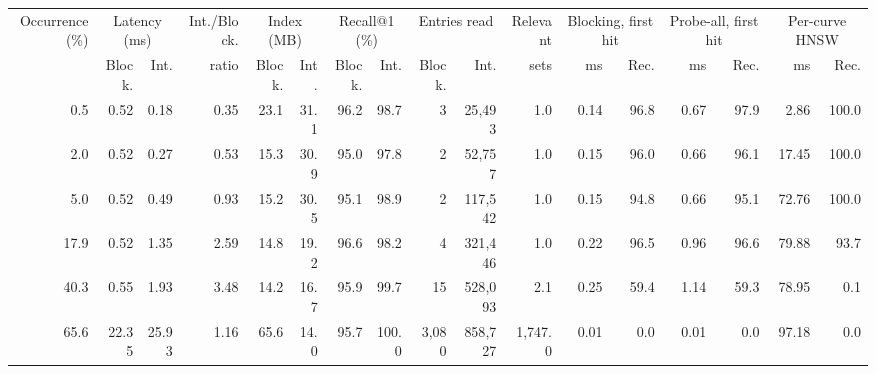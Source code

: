\begin{tabular}{rrrrrrrrrrrrrrrrr}
\toprule
Occurrence (\%) & \multicolumn{2}{c}{Latency (ms)} & Int./Block. & \multicolumn{2}{c}{Index (MB)} & \multicolumn{2}{c}{Recall@1 (\%)} & \multicolumn{2}{c}{Entries read} & Relevant & \multicolumn{2}{c}{Blocking, first hit} & \multicolumn{2}{c}{Probe-all, first hit} & \multicolumn{2}{c}{Per-curve HNSW}\\
\cmidrule(lr){2-3}\cmidrule(lr){5-6}\cmidrule(lr){7-8}\cmidrule(lr){9-10}\cmidrule(lr){12-13}\cmidrule(lr){14-15}\cmidrule(lr){16-17}
 & Block. & Int. & ratio & Block. & Int. & Block. & Int. & Block. & Int. & sets & ms & Rec. & ms & Rec. & ms & Rec.\\
\midrule
0.5 & 0.52 & 0.18 & 0.35 & 23.1 & 31.1 & 96.2 & 98.7 & 3 & 25{,}493 & 1.0 & 0.14 & 96.8 & 0.67 & 97.9 & 2.86 & 100.0\\
2.0 & 0.52 & 0.27 & 0.53 & 15.3 & 30.9 & 95.0 & 97.8 & 2 & 52{,}757 & 1.0 & 0.15 & 96.0 & 0.66 & 96.1 & 17.45 & 100.0\\
5.0 & 0.52 & 0.49 & 0.93 & 15.2 & 30.5 & 95.1 & 98.9 & 2 & 117{,}542 & 1.0 & 0.15 & 94.8 & 0.66 & 95.1 & 72.76 & 100.0\\
17.9 & 0.52 & 1.35 & 2.59 & 14.8 & 19.2 & 96.6 & 98.2 & 4 & 321{,}446 & 1.0 & 0.22 & 96.5 & 0.96 & 96.6 & 79.88 & 93.7\\
40.3 & 0.55 & 1.93 & 3.48 & 14.2 & 16.7 & 95.9 & 99.7 & 15 & 528{,}093 & 2.1 & 0.25 & 59.4 & 1.14 & 59.3 & 78.95 & 0.1\\
65.6 & 22.35 & 25.93 & 1.16 & 65.6 & 14.0 & 95.7 & 100.0 & 3{,}080 & 858{,}727 & 1{,}747.0 & 0.01 & 0.0 & 0.01 & 0.0 & 97.18 & 0.0\\
\bottomrule
\end{tabular}
